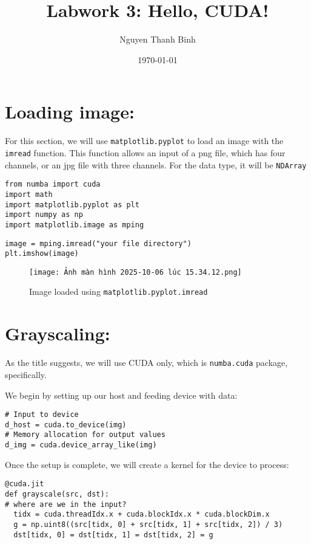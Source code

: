 \documentclass{article}
\title{\textbf{Labwork 3: Hello, CUDA!}}
\author{Nguyen Thanh Binh}
\date{\today}
\begin{document}
\maketitle

\section{Loading image:}

For this section, we will use \texttt{matplotlib.pyplot} to load an image with the \texttt{imread} function. This function allows an input of a png file, which has four channels, or an jpg file with three channels. For the data type, it will be \texttt{NDArray}

\begin{verbatim}
from numba import cuda
import math
import matplotlib.pyplot as plt
import numpy as np
import matplotlib.image as mping
\end{verbatim}

\begin{verbatim}
image = mping.imread("your file directory")
plt.imshow(image)
\end{verbatim}

\begin{figure}
    \centering
    \texttt{[image: Ảnh màn hình 2025-10-06 lúc 15.34.12.png]}
    \caption{Image loaded using \texttt{matplotlib.pyplot.imread}}
    \label{fig:placeholder}
\end{figure}

\section{Grayscaling:}

As the title suggests, we will use CUDA only, which is \texttt{numba.cuda} package, specifically. 

 We begin by setting up our host and feeding device with data:

\begin{verbatim}
# Input to device
d_host = cuda.to_device(img)
# Memory allocation for output values
d_img = cuda.device_array_like(img)
\end{verbatim}

Once the setup is complete, we will create a kernel for the device to process:

\begin{verbatim}
@cuda.jit
def grayscale(src, dst):
# where are we in the input?
  tidx = cuda.threadIdx.x + cuda.blockIdx.x * cuda.blockDim.x
  g = np.uint8((src[tidx, 0] + src[tidx, 1] + src[tidx, 2]) / 3)
  dst[tidx, 0] = dst[tidx, 1] = dst[tidx, 2] = g
\end{verbatim}
\end{document}
